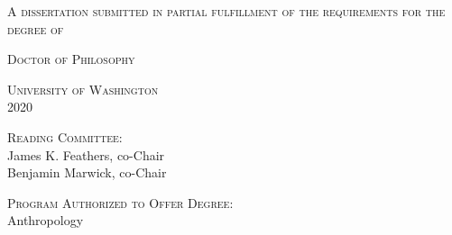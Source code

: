 

\begin{titlingpage}
\begin{center}\leavevmode

    \normalfont
    \vfill

    {\Large \textsc{\thesisTitle}\par}
    
    \vfill
    
    {\Large \thesisAuthor\par}%

	\vfill
    
    {\large \textsc{A dissertation
submitted in partial fulfillment of the
requirements for the degree of}}

    \vfill

    {\large \textsc{Doctor of Philosophy}}
    
\vfill

    
    {\large \textsc{University of Washington\\ 2020}}

	\vfill
	
	{\large \textsc{Reading Committee:}\\
	James K. Feathers, co-Chair\\
	Benjamin Marwick, co-Chair\\ }
	
	\vfill
	
	{\large \textsc{Program Authorized to Offer Degree:}\\
	Anthropology\\}
	
	

\end{center}%
\end{titlingpage}

